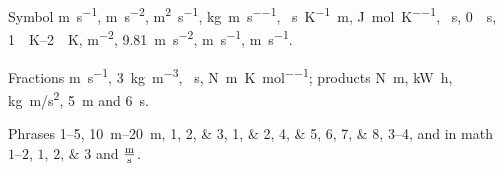 \documentclass{article}
\begin{document}
Symbol \si{\metre\per\second}, \si{\metre\per\second\squared}, \si{\metre\squared\per\second},
\si{\kilogram\per\metre\per\second}, \si{\per\second\per\kelvin\metre}, \si{\joule\per\mole\per\kelvin},
\si{\per\second}, \qty{0}{\per\second}, \qtyrange{1}{2}{\per\kelvin}, \si{\metre\tothe{-2}}, \qty{9.81}{\metre\per\second\squared},
\si[per-symbol=\div]{\metre\per\second}, \si[per-mode=power]{\metre\per\second}.

Fractions \si[per-mode=fraction]{\metre\per\second}, \qty[per-mode=fraction]{3}{\kilo\gram\per\cubic\metre},
\si[per-mode=fraction]{\per\second}, \si[per-mode=fraction]{\newton\metre\per\kelvin\per\mole}; products
\si[inter-unit-product=\cdot]{\newton\metre}, \si[inter-unit-product={}]{\kilo\watt\hour},
\si[inter-unit-product=\cdot]{kg.m/s^2}, \qty[quantity-product={}]{5}{\metre} and
\qty[quantity-product=\,]{6}{\second}.

Phrases \numrange{1}{5}, \qtyrange{10}{20}{\metre}, \numlist{1;2;3}, \numlist{1;2},
\numlist[list-separator={; }, list-pair-separator={ or }]{4;5}, \numlist[list-separator={; }]{6;7;8},
\numrange[range-phrase={ to about }]{3}{4}, and in math $\numrange{1}{2}$, $\numlist{1;2;3}$ and
$\si[per-mode=fraction]{\metre\per\second}$.
\end{document}

